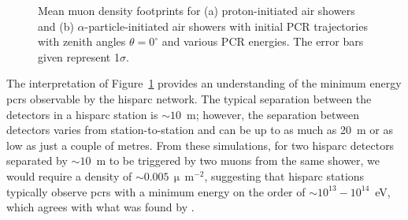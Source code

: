 \begin{figure}[ht!]
	\centering
	\qquad
	\caption{Mean muon density footprints for (a) proton-initiated air showers and (b) $\alpha$-particle-initiated air showers with initial PCR trajectories with zenith angles $\theta=0^{\circ}$ and various PCR energies. The error bars given represent 1$\sigma$.} \label{fig:shower_footprints}
\end{figure}

The interpretation of Figure~\ref{fig:shower_footprints} provides an understanding of the minimum energy \glspl{pcr} observable by the \gls{hisparc} network. The typical separation between the detectors in a \gls{hisparc} station is $\sim 10$~m; however, the separation between detectors varies from station-to-station and can be up to as much as 20~m or as low as just a couple of metres. From these simulations, for two \gls{hisparc} detectors separated by $\sim 10$~m to be triggered by two muons from the same shower, we would require a density of $\sim 0.005 \, \upmu \, \mathrm{m}^{-2}$, suggesting that \gls{hisparc} stations typically observe \glspl{pcr} with a minimum energy on the order of $\sim 10^{13} - 10^{14}$~eV, which agrees with what was found by \cite{van_dam_hisparc_2020}.

